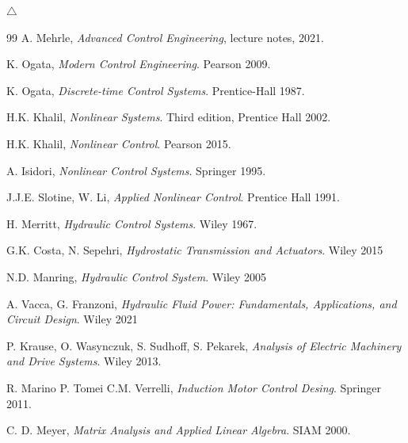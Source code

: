 \documentclass[12pt,a4paper,oneside]{book}
\begin{document}
\begin{onehalfspace}
\begin{example}
	\hfill$\triangle$
\end{example}

\begin{thebibliography}{99}
	A. Mehrle, \emph{Advanced Control Engineering}, lecture notes, 2021.
	
	K. Ogata, \emph{Modern Control Engineering}. Pearson 2009.	
	
	K. Ogata, \emph{Discrete-time Control Systems}. Prentice-Hall 1987.
	
	H.K. Khalil, \emph{Nonlinear Systems}. Third edition, Prentice Hall 
	2002.
	
	H.K. Khalil, \emph{Nonlinear Control}. Pearson 2015.
	
	A. Isidori, \emph{Nonlinear Control Systems}. Springer 1995.
	
	J.J.E. Slotine, W. Li, \emph{Applied Nonlinear Control}. Prentice Hall 
	1991.
	
	H. Merritt, \emph{Hydraulic Control Systems}. Wiley 1967.
	
	G.K. Costa, N. Sepehri, \emph{Hydrostatic Transmission and Actuators}. 
	Wiley 2015
	
	N.D. Manring, \emph{Hydraulic Control System}. Wiley 2005
	
	A. Vacca, G. Franzoni, \emph{Hydraulic Fluid Power: Fundamentals, 
		Applications, and Circuit Design}. Wiley 2021
	
	P. Krause, O. Wasynczuk, S. Sudhoff, S. Pekarek, \emph{Analysis of Electric Machinery and Drive Systems}. Wiley 2013.
	
	R. Marino P. Tomei C.M. Verrelli, \emph{Induction Motor Control Desing}. Springer 2011.
	
	C. D. Meyer, \emph{Matrix Analysis and Applied Linear Algebra}. SIAM 2000.
\end{thebibliography}
\end{onehalfspace}
\end{document}
